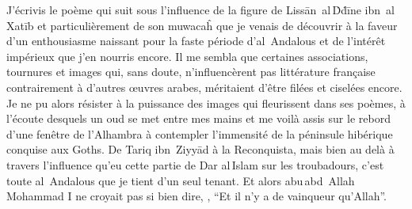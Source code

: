 \begin{prose}
  J’écrivis le poème qui suit sous l’influence de la figure de Lissān~al\,Ḋḋīne ibn~al\,Xatīb et particulièrement de son muwacaĥ  que je venais de découvrir à la faveur d’un enthousiasme naissant pour la faste période d’al~Andalous et de l’intérêt impérieux que j’en nourris encore. Il me sembla que certaines associations, tournures et images qui, sans doute, n’influencèrent pas littérature française contrairement à d’autres œuvres arabes, méritaient d’être filées et ciselées encore. Je ne pu alors résister à la puissance des images qui fleurissent dans ses poèmes, à l’écoute desquels un oud se met entre mes mains et me voilà assis sur le rebord d’une fenêtre de l’Alhambra à contempler l’immensité de la péninsule hibérique conquise aux Goths. De Tariq ibn~Ziyyād à la Reconquista, mais bien au delà à travers l’influence qu’eu cette partie de Dar al\,Islam sur les troubadours, c’est toute al~Andalous que je tient d’un seul tenant. Et alors abu\,abd~Allah Mohammad {I}\ier{} ne croyait pas si bien dire, , \enquote{Et il n’y a de vainqueur qu’Allah}.

\end{prose}

